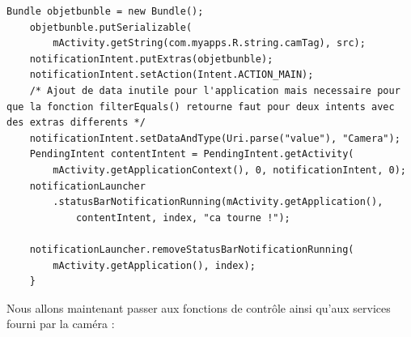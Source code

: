 \begin{enumerate}
\begin{lstlisting}[format=JAVA,caption={Test 3 : Notification En-Cours}]
	Bundle objetbunble = new Bundle();
	objetbunble.putSerializable(
		mActivity.getString(com.myapps.R.string.camTag), src);
	notificationIntent.putExtras(objetbunble);
	notificationIntent.setAction(Intent.ACTION_MAIN);
	/* Ajout de data inutile pour l'application mais necessaire pour que la fonction filterEquals() retourne faut pour deux intents avec des extras differents */
	notificationIntent.setDataAndType(Uri.parse("value"), "Camera");
	PendingIntent contentIntent = PendingIntent.getActivity(
		mActivity.getApplicationContext(), 0, notificationIntent, 0);
	notificationLauncher
		.statusBarNotificationRunning(mActivity.getApplication(),
			contentIntent, index, "ca tourne !");

	notificationLauncher.removeStatusBarNotificationRunning(
		mActivity.getApplication(), index);
    }
\end{lstlisting}

\end{enumerate}
Nous allons maintenant passer aux fonctions de contrôle ainsi qu'aux services fourni par la caméra :
